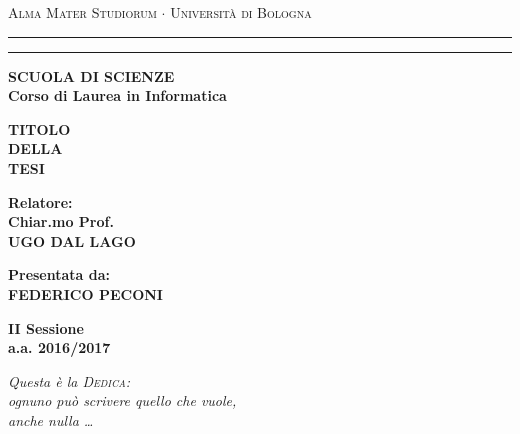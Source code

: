 \documentclass[12pt,a4paper,openright]{report}
\begin{document}
\begin{titlepage}
\begin{center}
{{\Large{\textsc{Alma Mater Studiorum $\cdot$ Universit\`a di
Bologna}}}} \rule[0.1cm]{15.8cm}{0.1mm}
\rule[0.5cm]{15.8cm}{0.6mm}
{\small{\bf SCUOLA DI SCIENZE\\
Corso di Laurea in Informatica }}
\end{center}
\vspace{15mm}
\begin{center}
{\LARGE{\bf TITOLO}}\\
\vspace{3mm}
{\LARGE{\bf DELLA}}\\
\vspace{3mm}
{\LARGE{\bf TESI}}\\
\end{center}
\vspace{40mm}
\par
\noindent
\begin{minipage}[t]{0.47\textwidth}
{\large{\bf Relatore:\\
Chiar.mo Prof.\\
UGO DAL LAGO}}
\end{minipage}
\hfill
\begin{minipage}[t]{0.47\textwidth}\raggedleft
{\large{\bf Presentata da:\\
FEDERICO PECONI}}
\end{minipage}
\vspace{20mm}
\begin{center}
{\large{\bf II Sessione\\%
a.a. 2016/2017 }}%
\end{center}
\newpage
\thispagestyle{empty}                   %
\topmargin=6.5cm                        %
\raggedleft                             %
\large                                  %
\em                                     %
Questa \`e la \textsc{Dedica}:\\
ognuno pu\`o scrivere quello che vuole, \\
anche nulla \ldots                      %
\newpage                                %
%
\clearpage{\pagestyle{empty}\cleardoublepage}%
\end{titlepage}
\tableofcontents
\end{document}
